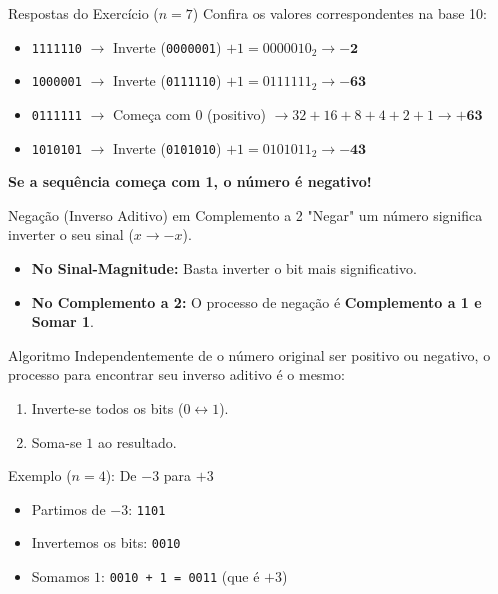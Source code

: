 \begin{frame}{Respostas do Exercício ($n=7$)}
    Confira os valores correspondentes na base 10:

    \begin{itemize}
        \item[\textbf{a)}] \texttt{1111110} $\rightarrow$ Inverte (\texttt{0000001}) $+ 1 = 0000010_2 \rightarrow \mathbf{-2}$
        \item[\textbf{b)}] \texttt{1000001} $\rightarrow$ Inverte (\texttt{0111110}) $+ 1 = 0111111_2 \rightarrow \mathbf{-63}$
        \item[\textbf{c)}] \texttt{0111111} $\rightarrow$ Começa com 0 (positivo) $\rightarrow 32+16+8+4+2+1 \rightarrow \mathbf{+63}$
        \item[\textbf{d)}] \texttt{1010101} $\rightarrow$ Inverte (\texttt{0101010}) $+ 1 = 0101011_2 \rightarrow \mathbf{-43}$
    \end{itemize}

    \textbf{Se a sequência começa com \textbf{1}, o número é negativo!}
\end{frame}

\begin{frame}{Negação (Inverso Aditivo) em Complemento a 2}
    "Negar" um número significa inverter o seu sinal ($x \rightarrow -x$).

    \begin{itemize}
        \item \textbf{No Sinal-Magnitude:} Basta inverter o bit mais significativo.
        \item \textbf{No Complemento a 2:} O processo de negação é \textbf{Complemento a 1 e Somar 1}.
    \end{itemize}

    \begin{block}{Algoritmo}
        Independentemente de o número original ser positivo ou negativo, o processo para encontrar seu inverso aditivo é o mesmo:
        \begin{enumerate}
            \item Inverte-se todos os bits ($0 \leftrightarrow 1$).
            \item Soma-se $1$ ao resultado.
        \end{enumerate}
    \end{block}

    \begin{exampleblock}{Exemplo ($n=4$): De $-3$ para $+3$}
        \begin{itemize}
            \item Partimos de $-3$: \texttt{1101}
            \item Invertemos os bits: \texttt{0010}
            \item Somamos $1$: \texttt{0010 + 1 = 0011} (que é $+3$)
        \end{itemize}
    \end{exampleblock}
\end{frame}

